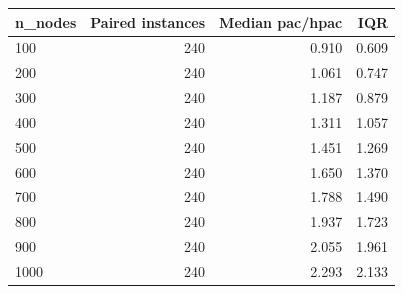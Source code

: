 \begin{tabular}{lrrr}
\toprule
n\_nodes & Paired instances & Median pac/hpac & IQR \\
\midrule
100 & 240 & 0.910 & 0.609 \\
200 & 240 & 1.061 & 0.747 \\
300 & 240 & 1.187 & 0.879 \\
400 & 240 & 1.311 & 1.057 \\
500 & 240 & 1.451 & 1.269 \\
600 & 240 & 1.650 & 1.370 \\
700 & 240 & 1.788 & 1.490 \\
800 & 240 & 1.937 & 1.723 \\
900 & 240 & 2.055 & 1.961 \\
1000 & 240 & 2.293 & 2.133 \\
\bottomrule
\end{tabular}
